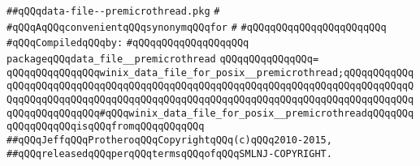 \label{src/lib/std/src/posix/data-file--premicrothread.pkg}
\verb|##qQQqdata-file--premicrothread.pkg|\newline
\verb|#|\newline
\verb|#qQQqAqQQqconvenientqQQqsynonymqQQqfor|\newline
\verb|#|\newline
\verb|#qQQqqQQqqQQqqQQqqQQq|\verb|qQQq|\newline
\newline
\verb|#qQQqCompiledqQQqby:|\newline
\verb|#qQQqqQQqqQQqqQQqqQQq|\newline
\newline
\newline
\verb|packageqQQqdata_file__premicrothread|\newline
\verb|qQQqqQQqqQQqqQQq=|\newline
\verb|qQQqqQQqqQQqqQQqwinix_data_file_for_posix__premicrothread;qQQqqQQqqQQqqQQqqQQqqQQqqQQqqQQqqQQqqQQqqQQqqQQqqQQqqQQqqQQqqQQqqQQqqQQqqQQqqQQqqQQqqQQqqQQqqQQqqQQqqQQqqQQqqQQqqQQqqQQqqQQqqQQqqQQqqQQqqQQqqQQqqQQqqQQqqQQqqQQqqQQqqQQq#qQQqwinix_data_file_for_posix__premicrothreadqQQqqQQqqQQqqQQqqQQqisqQQqfromqQQqqQQqqQQq|\newline
\newline
\newline
\newline
\newline
\verb|##qQQqJeffqQQqProtheroqQQqCopyrightqQQq(c)qQQq2010-2015,|\newline
\verb|##qQQqreleasedqQQqperqQQqtermsqQQqofqQQqSMLNJ-COPYRIGHT.|\newline

